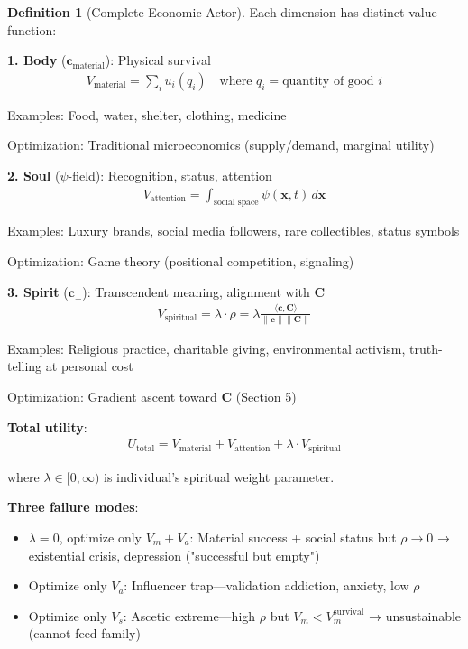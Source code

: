 \documentclass[11pt,a4paper]{article}
\theoremstyle{definition}
\newtheorem{definition}{Definition}[section]
\theoremstyle{remark}
\newcommand{\cc}{\mathbf{c}}
\begin{document}
\begin{small}
\begin{enumerate}
\begin{definition}[Complete Economic Actor]
Each dimension has distinct value function:

\textbf{1. Body} (\(\cc_{\text{material}}\)): Physical survival
\begin{align}
V_{\text{material}} = \sum_i u_i(q_i) \quad \text{where } q_i = \text{quantity of good } i
\end{align}

Examples: Food, water, shelter, clothing, medicine

Optimization: Traditional microeconomics (supply/demand, marginal utility)

\textbf{2. Soul} (\(\psi\)-field): Recognition, status, attention
\begin{align}
V_{\text{attention}} = \int_{\text{social space}} \psi(\mathbf{x}, t) \, d\mathbf{x}
\end{align}

Examples: Luxury brands, social media followers, rare collectibles, status symbols

Optimization: Game theory (positional competition, signaling)

\textbf{3. Spirit} (\(\cc_\perp\)): Transcendent meaning, alignment with \(\mathbf{C}\)
\begin{align}
V_{\text{spiritual}} = \lambda \cdot \rho = \lambda \frac{\langle \cc, \mathbf{C} \rangle}{\|\cc\| \|\mathbf{C}\|}
\end{align}

Examples: Religious practice, charitable giving, environmental activism, truth-telling at personal cost

Optimization: Gradient ascent toward \(\mathbf{C}\) (Section 5)

\textbf{Total utility}:
\begin{align}
U_{\text{total}} = V_{\text{material}} + V_{\text{attention}} + \lambda \cdot V_{\text{spiritual}}
\end{align}

where \(\lambda \in [0, \infty)\) is individual's spiritual weight parameter.

\textbf{Three failure modes}:
\begin{itemize}
    \item \(\lambda = 0\), optimize only \(V_m + V_a\): Material success + social status but \(\rho \to 0\) → existential crisis, depression ("successful but empty")
    \item Optimize only \(V_a\): Influencer trap—validation addiction, anxiety, low \(\rho\)
    \item Optimize only \(V_s\): Ascetic extreme—high \(\rho\) but \(V_m < V_m^{\text{survival}}\) → unsustainable (cannot feed family)
\end{itemize}


\end{definition}
\end{enumerate}
\end{small}
\end{document}
